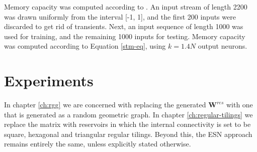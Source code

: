 Memory capacity was computed according to \cite{farkas_computational_2016}. An
input stream of length 2200 was drawn uniformly from the interval [-1, 1], and
the first 200 inputs were discarded to get rid of transients. Next, an input
sequence of length 1000 was used for training, and the remaining 1000 inputs for
testing. Memory capacity was computed according to Equation \ref{stm-eq}, using
$k = 1.4N$ output neurons.

\section{Experiments}

In chapter \ref{ch:rgg} we are concerned with replacing the generated
$\mathbf{W}^{res}$ with one that is generated as a random geometric graph. In
chapter \ref{ch:regular-tilings} we replace the matrix with reservoirs in which
the internal connectivity is set to be square, hexagonal and triangular regular
tilings. Beyond this, the ESN approach remains entirely the same, unless
explicitly stated otherwise.

